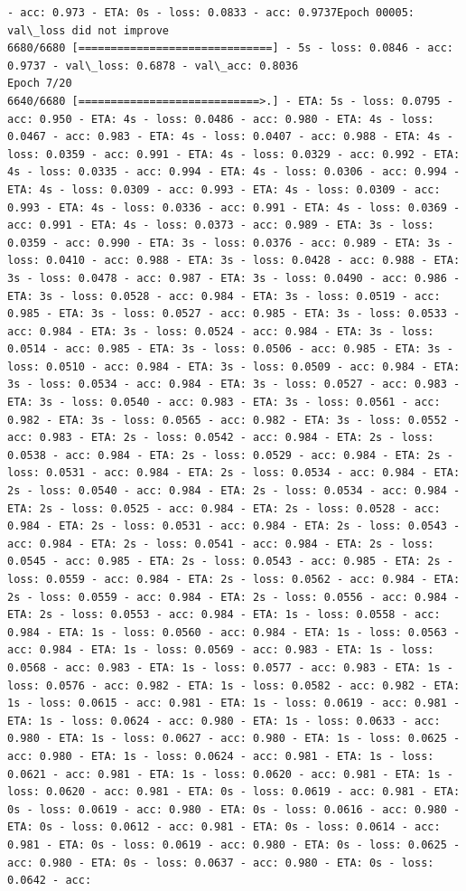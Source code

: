 \documentclass[11pt]{article}
\begin{document}
\begin{Verbatim}[commandchars=\\\{\}]
- acc: 0.973 - ETA: 0s - loss: 0.0833 - acc: 0.9737Epoch 00005: val\_loss did not improve
6680/6680 [==============================] - 5s - loss: 0.0846 - acc: 0.9737 - val\_loss: 0.6878 - val\_acc: 0.8036
Epoch 7/20
6640/6680 [============================>.] - ETA: 5s - loss: 0.0795 - acc: 0.950 - ETA: 4s - loss: 0.0486 - acc: 0.980 - ETA: 4s - loss: 0.0467 - acc: 0.983 - ETA: 4s - loss: 0.0407 - acc: 0.988 - ETA: 4s - loss: 0.0359 - acc: 0.991 - ETA: 4s - loss: 0.0329 - acc: 0.992 - ETA: 4s - loss: 0.0335 - acc: 0.994 - ETA: 4s - loss: 0.0306 - acc: 0.994 - ETA: 4s - loss: 0.0309 - acc: 0.993 - ETA: 4s - loss: 0.0309 - acc: 0.993 - ETA: 4s - loss: 0.0336 - acc: 0.991 - ETA: 4s - loss: 0.0369 - acc: 0.991 - ETA: 4s - loss: 0.0373 - acc: 0.989 - ETA: 3s - loss: 0.0359 - acc: 0.990 - ETA: 3s - loss: 0.0376 - acc: 0.989 - ETA: 3s - loss: 0.0410 - acc: 0.988 - ETA: 3s - loss: 0.0428 - acc: 0.988 - ETA: 3s - loss: 0.0478 - acc: 0.987 - ETA: 3s - loss: 0.0490 - acc: 0.986 - ETA: 3s - loss: 0.0528 - acc: 0.984 - ETA: 3s - loss: 0.0519 - acc: 0.985 - ETA: 3s - loss: 0.0527 - acc: 0.985 - ETA: 3s - loss: 0.0533 - acc: 0.984 - ETA: 3s - loss: 0.0524 - acc: 0.984 - ETA: 3s - loss: 0.0514 - acc: 0.985 - ETA: 3s - loss: 0.0506 - acc: 0.985 - ETA: 3s - loss: 0.0510 - acc: 0.984 - ETA: 3s - loss: 0.0509 - acc: 0.984 - ETA: 3s - loss: 0.0534 - acc: 0.984 - ETA: 3s - loss: 0.0527 - acc: 0.983 - ETA: 3s - loss: 0.0540 - acc: 0.983 - ETA: 3s - loss: 0.0561 - acc: 0.982 - ETA: 3s - loss: 0.0565 - acc: 0.982 - ETA: 3s - loss: 0.0552 - acc: 0.983 - ETA: 2s - loss: 0.0542 - acc: 0.984 - ETA: 2s - loss: 0.0538 - acc: 0.984 - ETA: 2s - loss: 0.0529 - acc: 0.984 - ETA: 2s - loss: 0.0531 - acc: 0.984 - ETA: 2s - loss: 0.0534 - acc: 0.984 - ETA: 2s - loss: 0.0540 - acc: 0.984 - ETA: 2s - loss: 0.0534 - acc: 0.984 - ETA: 2s - loss: 0.0525 - acc: 0.984 - ETA: 2s - loss: 0.0528 - acc: 0.984 - ETA: 2s - loss: 0.0531 - acc: 0.984 - ETA: 2s - loss: 0.0543 - acc: 0.984 - ETA: 2s - loss: 0.0541 - acc: 0.984 - ETA: 2s - loss: 0.0545 - acc: 0.985 - ETA: 2s - loss: 0.0543 - acc: 0.985 - ETA: 2s - loss: 0.0559 - acc: 0.984 - ETA: 2s - loss: 0.0562 - acc: 0.984 - ETA: 2s - loss: 0.0559 - acc: 0.984 - ETA: 2s - loss: 0.0556 - acc: 0.984 - ETA: 2s - loss: 0.0553 - acc: 0.984 - ETA: 1s - loss: 0.0558 - acc: 0.984 - ETA: 1s - loss: 0.0560 - acc: 0.984 - ETA: 1s - loss: 0.0563 - acc: 0.984 - ETA: 1s - loss: 0.0569 - acc: 0.983 - ETA: 1s - loss: 0.0568 - acc: 0.983 - ETA: 1s - loss: 0.0577 - acc: 0.983 - ETA: 1s - loss: 0.0576 - acc: 0.982 - ETA: 1s - loss: 0.0582 - acc: 0.982 - ETA: 1s - loss: 0.0615 - acc: 0.981 - ETA: 1s - loss: 0.0619 - acc: 0.981 - ETA: 1s - loss: 0.0624 - acc: 0.980 - ETA: 1s - loss: 0.0633 - acc: 0.980 - ETA: 1s - loss: 0.0627 - acc: 0.980 - ETA: 1s - loss: 0.0625 - acc: 0.980 - ETA: 1s - loss: 0.0624 - acc: 0.981 - ETA: 1s - loss: 0.0621 - acc: 0.981 - ETA: 1s - loss: 0.0620 - acc: 0.981 - ETA: 1s - loss: 0.0620 - acc: 0.981 - ETA: 0s - loss: 0.0619 - acc: 0.981 - ETA: 0s - loss: 0.0619 - acc: 0.980 - ETA: 0s - loss: 0.0616 - acc: 0.980 - ETA: 0s - loss: 0.0612 - acc: 0.981 - ETA: 0s - loss: 0.0614 - acc: 0.981 - ETA: 0s - loss: 0.0619 - acc: 0.980 - ETA: 0s - loss: 0.0625 - acc: 0.980 - ETA: 0s - loss: 0.0637 - acc: 0.980 - ETA: 0s - loss: 0.0642 - acc: 
\end{Verbatim}
\end{document}

